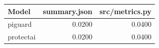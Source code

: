 \begin{tabular}{lrr}
\toprule
\textbf{Model} & \textbf{summary.json} & \textbf{src/metrics.py} \\
\midrule
piguard & 0.0200 & 0.0400 \\
protectai & 0.0200 & 0.0400 \\
\bottomrule
\end{tabular}
